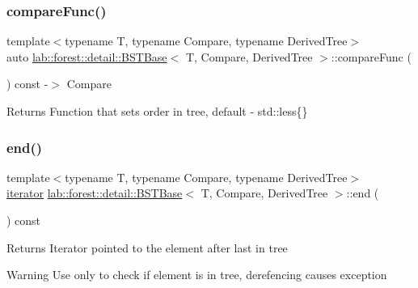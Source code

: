 \subsubsection{\texorpdfstring{compare\+Func()}{compareFunc()}}
{\footnotesize\ttfamily template$<$typename T, typename Compare, typename Derived\+Tree$>$ \\
auto \hyperlink{classlab_1_1forest_1_1detail_1_1BSTBase}{lab\+::forest\+::detail\+::\+B\+S\+T\+Base}$<$ T, Compare, Derived\+Tree $>$\+::compare\+Func (\begin{DoxyParamCaption}{ }\end{DoxyParamCaption}) const -\/$>$  Compare\hspace{0.3cm}{\ttfamily [noexcept]}}

\begin{DoxyReturn}{Returns}
Function that sets order in tree, default -\/ std\+::less\{\} 
\end{DoxyReturn}
\mbox{\label{classlab_1_1forest_1_1detail_1_1BSTBase_ad2ea364cc61d5581a861d1aab3734129}} 
\subsubsection{\texorpdfstring{end()}{end()}}
{\footnotesize\ttfamily template$<$typename T, typename Compare, typename Derived\+Tree$>$ \\
\hyperlink{classlab_1_1forest_1_1detail_1_1BSTIterator}{iterator} \hyperlink{classlab_1_1forest_1_1detail_1_1BSTBase}{lab\+::forest\+::detail\+::\+B\+S\+T\+Base}$<$ T, Compare, Derived\+Tree $>$\+::end (\begin{DoxyParamCaption}{ }\end{DoxyParamCaption}) const\hspace{0.3cm}{\ttfamily [noexcept]}}

\begin{DoxyReturn}{Returns}
Iterator pointed to the element after last in tree 
\end{DoxyReturn}
\begin{DoxyWarning}{Warning}
Use only to check if element is in tree, derefencing causes exception 
\end{DoxyWarning}
\mbox{\label{classlab_1_1forest_1_1detail_1_1BSTBase_aac3bd1152a3754526dcc429c30f74ffb}} 
